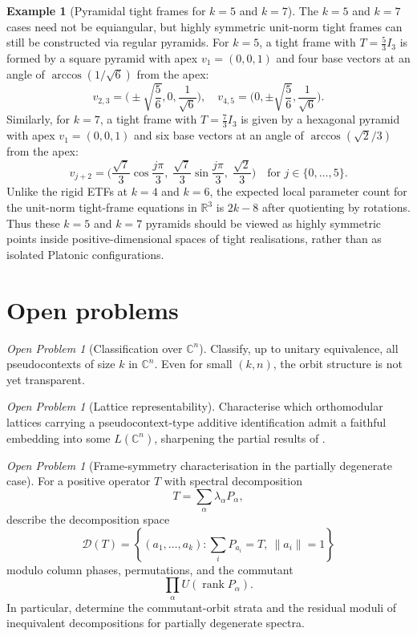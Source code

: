 \documentclass[
  twocolumn,
  aps,
  pra,
  floatfix,
  amsmath,amssymb,
  longbibliography
]{revtex4-2}
\theoremstyle{definition}
\newtheorem{example}[theorem]{Example}
\theoremstyle{remark}
\newtheorem{problem}[theorem]{Open Problem}
\begin{document}
\begin{example}[Pyramidal tight frames for $k=5$ and $k=7$]
\label{ex:pyramids}
The $k=5$ and $k=7$ cases need not be equiangular, but highly symmetric
unit-norm tight frames can still be constructed via regular pyramids.
For $k=5$, a tight frame with $T=\tfrac{5}{3}I_3$ is formed by a square pyramid with apex $v_1 = (0,0,1)$ and four base vectors at an angle of $\arccos(1/\sqrt{6})$ from the apex:
\[
    v_{2,3} = \bigg(\pm \sqrt{\frac{5}{6}}, 0, \frac{1}{\sqrt{6}}\bigg), \quad
    v_{4,5} = \bigg(0, \pm \sqrt{\frac{5}{6}}, \frac{1}{\sqrt{6}}\bigg).
\]
Similarly, for $k=7$, a tight frame with $T=\tfrac{7}{3}I_3$ is given by a hexagonal pyramid with apex $v_1=(0,0,1)$ and six base vectors at an angle of $\arccos(\sqrt{2}/3)$ from the apex:
\[
    v_{j+2} = \bigg(\frac{\sqrt{7}}{3}\cos\frac{j\pi}{3},\; \frac{\sqrt{7}}{3}\sin\frac{j\pi}{3},\; \frac{\sqrt{2}}{3}\bigg) \quad \text{for } j \in \{0, \dots, 5\}.
\]
Unlike the rigid ETFs at $k=4$ and $k=6$, the expected local
parameter count for the unit-norm tight-frame equations in
$\mathbb{R}^3$ is $2k-8$ after quotienting by rotations.  Thus these
$k=5$ and $k=7$ pyramids should be viewed as highly symmetric points
inside positive-dimensional spaces of tight realisations, rather than
as isolated Platonic configurations.
\end{example}


\section{Open problems}

\begin{problem}[Classification over $\mathbb{C}^n$]
Classify, up to unitary equivalence, all pseudocontexts of size $k$
in $\mathbb{C}^n$.  Even for small $(k,n)$, the orbit structure is
not yet transparent.
\end{problem}

\begin{problem}[Lattice representability]
Characterise which orthomodular lattices carrying a
pseudocontext-type additive identification admit a faithful embedding
into some $L(\mathbb{C}^n)$, sharpening the partial results of
\cite{2023-navara-svozil,navara-2024-e}.
\end{problem}

\begin{problem}[Frame-symmetry characterisation in the partially
degenerate case]


For a positive operator \(T\) with spectral decomposition
\[
T=\sum_\alpha \lambda_\alpha P_\alpha,
\]
describe the decomposition space
\[
\mathcal D(T)=
\left\{
(a_1,\ldots,a_k):
\sum_i P_{a_i}=T,\ \|a_i\|=1
\right\}
\]
modulo column phases, permutations, and the commutant
\[
\prod_\alpha U(\operatorname{rank}P_\alpha).
\]
In particular, determine the commutant-orbit strata and the residual
moduli of inequivalent decompositions for partially degenerate spectra.
\end{problem}
\end{document}
